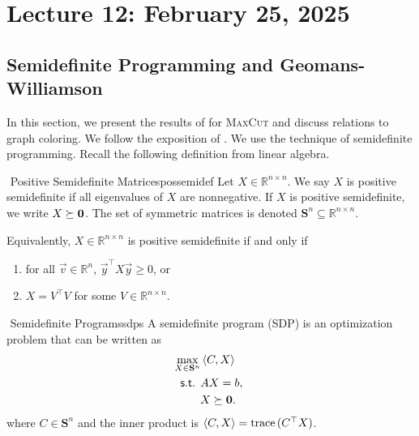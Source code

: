 \pagebreak

\section{Lecture 12: February 25, 2025}

    \subsection{Semidefinite Programming and Geomans-Williamson}

        In this section, we present the results of \cite{goemans1995improvedmaxcut} for \textsc{MaxCut} and discuss relations to graph coloring. We follow the exposition of \cite{williamson2011design}. We use the technique of semidefinite programming. Recall the following definition from linear algebra.
        \begin{definition}{\Stop\,\,Positive Semidefinite Matrices}{possemidef}
            Let \(X\in\mathbb{R}^{n\times n}\). We say \(X\) is positive semidefinite if all eigenvalues of \(X\) are nonnegative. If \(X\) is positive semidefinite, we write \(X\succeq\mathbf{0}\). The set of symmetric matrices is denoted \(\mathbf{S}^n\subseteq \mathbb{R}^{n\times n}\).
        \end{definition}
        \begin{remark*}
            Equivalently, \(X\in\mathbb{R}^{n\times n}\) is positive semidefinite if and only if 
            \begin{enumerate}
                \item for all \(\vec{v}\in\mathbb{R}^n\), \(\vec{y}^\top X\vec{y}\geq0\), or 
                \item \(X=V^\top V\) for some \(V\in\mathbb{R}^{n\times n}\).
            \end{enumerate}
        \end{remark*}
        \begin{definition}{\Stop\,\,Semidefinite Programs}{sdps}
            A semidefinite program (SDP) is an optimization problem that can be written as
            \begin{align*}
                \max_{X\in \mathbf{S}^n} &\left\langle C,X\right\rangle \quad \\
                \textsf{s.t. }&AX=b, \\
                &X \succeq\mathbf{0}.
            \end{align*}
            where \(C\in \mathbf{S}^n\) and the inner product is \(\left\langle C,X\right\rangle=\text{trace\,}(C^\top X)\).
        \end{definition}
